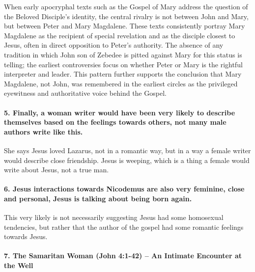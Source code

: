 When early apocryphal texts such as the Gospel of Mary address the question of the Beloved Disciple’s identity, the central rivalry is not between John and Mary, but between Peter and Mary Magdalene. These texts consistently portray Mary Magdalene as the recipient of special revelation and as the disciple closest to Jesus, often in direct opposition to Peter’s authority. The absence of any tradition in which John son of Zebedee is pitted against Mary for this status is telling; the earliest controversies focus on whether Peter or Mary is the rightful interpreter and leader. This pattern further supports the conclusion that Mary Magdalene, not John, was remembered in the earliest circles as the privileged eyewitness and authoritative voice behind the Gospel.

\paragraph{5.
Finally, a woman writer would have been very likely to describe themselves based on the feelings towards others, not many male authors write like this.}\label{par:finally-a-woman-writer-would-have-been-very-likely-to-describe-themselves-based-on-the-feelings-towards-others-not-many-male-authors-write-like-this.}

She says Jesus loved Lazarus, not in a romantic way, but in a way a female writer would describe close friendship.
Jesus is weeping, which is a thing a female would write about Jesus, not a true man.

\paragraph{6.
Jesus interactions towards Nicodemus are also very feminine, close and personal, Jesus is talking about being born again.}\label{par:jesus-interactions-towards-nicodemus-are-also-very-feminine-close-and-personal-jesus-is-talking-about-being-born-again.}

This very likely is not necessarily suggesting Jesus had some homosexual tendencies, but rather that the author of the gospel had some romantic feelings towards Jesus.

\paragraph{7.
The Samaritan Woman (John 4:1-42) -- An Intimate Encounter at the Well}\label{par:the-samaritan-woman-john-41-42-an-intimate-encounter-at-the-well}

